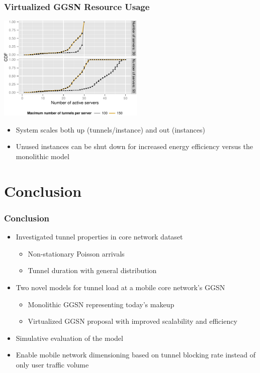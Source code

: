 \documentclass{beamer}
\begin{document}
\begin{frame}
	\frametitle{Virtualized GGSN Resource Usage}

	\begin{center}
		\includegraphics[height=5cm]{figures/instanceuse-multiserver.pdf}
	\end{center}

	\begin{itemize}
		\item System scales both up (tunnels/instance) and out (instances)
		\item Unused instances can be shut down for increased energy efficiency versus the monolithic model
	\end{itemize}
\end{frame}




\section{Conclusion}

\begin{frame}
	\frametitle{Conclusion}

	\begin{itemize}
		\item Investigated tunnel properties in core network dataset

		\begin{itemize}
			\item Non-stationary Poisson arrivals
			\item Tunnel duration with general distribution
		\end{itemize}

		\item Two novel models for tunnel load at a mobile core network's GGSN
		\begin{itemize}
			\item Monolithic GGSN representing today's makeup
			\item Virtualized GGSN proposal with improved scalability and efficiency
		\end{itemize}

		\item Simulative evaluation of the model

		\item Enable mobile network dimensioning based on tunnel blocking rate instead of only user traffic volume


	\end{itemize}

\end{frame}
\end{document}
